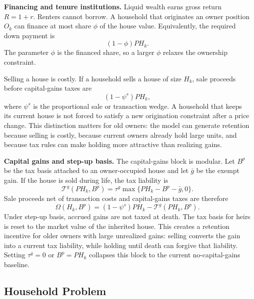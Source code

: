 \documentclass[11pt]{article}
\newcommand{\Tg}{\mathcal T^g}
\begin{document}
\textbf{Financing and tenure institutions.}
Liquid wealth earns gross return $R=1+r$. Renters cannot borrow. A household
that originates an owner position $O_k$ can finance at most share $\phi$ of the
house value. Equivalently, the required down payment is
\begin{equation}
    (1-\phi)PH_k.
    \label{eq:down_payment}
\end{equation}
The parameter $\phi$ is the financed share, so a larger $\phi$ relaxes the
ownership constraint.

Selling a house is costly. If a household sells a house of size $H_k$, sale
proceeds before capital-gains taxes are
\begin{equation*}
    (1-\psi^s)PH_k,
\end{equation*}
where $\psi^s$ is the proportional sale or transaction wedge. A household that
keeps its current house is not forced to satisfy a new origination constraint
after a price change. This distinction matters for old owners: the model can
generate retention because selling is costly, because current owners already
hold large units, and because tax rules can make holding more attractive than
realizing gains.

\textbf{Capital gains and step-up basis.}
The capital-gains block is modular. Let $B^p$ be the tax basis attached to an
owner-occupied house and let $\bar g$ be the exempt gain. If the house is sold
during life, the tax liability is
\begin{equation}
    \Tg(PH_k,B^p)
    =
    \tau^g\max\{PH_k-B^p-\bar g,0\}.
    \label{eq:capital_gains_tax}
\end{equation}
Sale proceeds net of transaction costs and capital-gains taxes are therefore
\begin{equation}
    \Omega(H_k,B^p)
    =
    (1-\psi^s)PH_k-\Tg(PH_k,B^p).
    \label{eq:sale_proceeds}
\end{equation}
Under step-up basis, accrued gains are not taxed at death. The tax basis for
heirs is reset to the market value of the inherited house. This creates a
retention incentive for older owners with large unrealized gains: selling
converts the gain into a current tax liability, while holding until death can
forgive that liability. Setting $\tau^g=0$ or $B^p=PH_k$ collapses this block to
the current no-capital-gains baseline.

\subsection{Household Problem}
\end{document}
